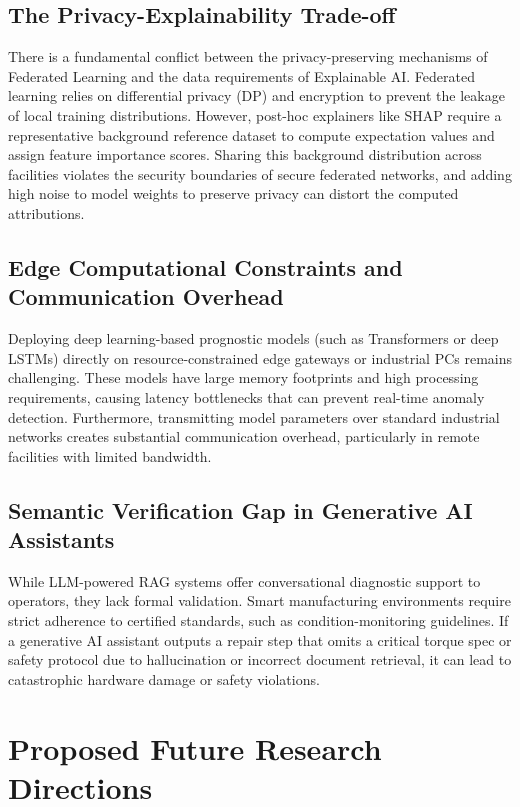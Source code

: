 \documentclass[journal,10pt,compsoc]{IEEEtran}
\begin{document}
\subsection{The Privacy-Explainability Trade-off}
There is a fundamental conflict between the privacy-preserving mechanisms of Federated Learning and the data requirements of Explainable AI. Federated learning relies on differential privacy (DP) and encryption to prevent the leakage of local training distributions. However, post-hoc explainers like SHAP require a representative background reference dataset to compute expectation values and assign feature importance scores. Sharing this background distribution across facilities violates the security boundaries of secure federated networks, and adding high noise to model weights to preserve privacy can distort the computed attributions.

\subsection{Edge Computational Constraints and Communication Overhead}
Deploying deep learning-based prognostic models (such as Transformers or deep LSTMs) directly on resource-constrained edge gateways or industrial PCs remains challenging. These models have large memory footprints and high processing requirements, causing latency bottlenecks that can prevent real-time anomaly detection. Furthermore, transmitting model parameters over standard industrial networks creates substantial communication overhead, particularly in remote facilities with limited bandwidth.

\subsection{Semantic Verification Gap in Generative AI Assistants}
While LLM-powered RAG systems offer conversational diagnostic support to operators, they lack formal validation. Smart manufacturing environments require strict adherence to certified standards, such as condition-monitoring guidelines. If a generative AI assistant outputs a repair step that omits a critical torque spec or safety protocol due to hallucination or incorrect document retrieval, it can lead to catastrophic hardware damage or safety violations.

\section{Proposed Future Research Directions}
\label{sec:future_directions}
\end{document}
